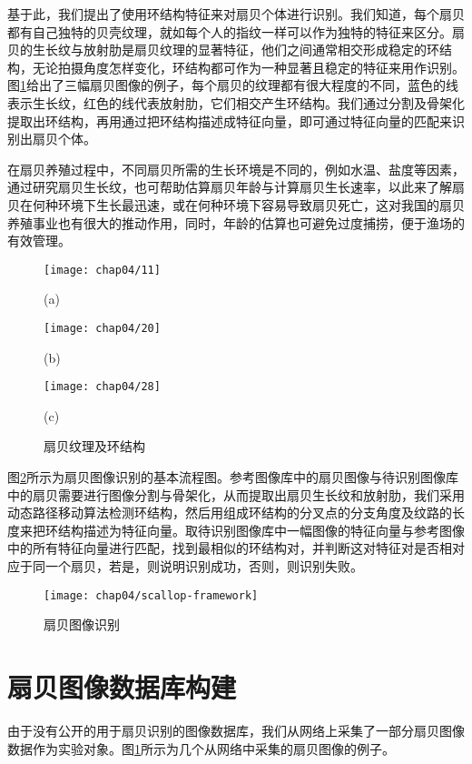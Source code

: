 基于此，我们提出了使用环结构特征来对扇贝个体进行识别。我们知道，每个扇贝都有自己独特的贝壳纹理，就如每个人的指纹一样可以作为独特的特征来区分。扇贝的生长纹与放射肋是扇贝纹理的显著特征，他们之间通常相交形成稳定的环结构，无论拍摄角度怎样变化，环结构都可作为一种显著且稳定的特征来用作识别。图\ref{fig:scallop}给出了三幅扇贝图像的例子，每个扇贝的纹理都有很大程度的不同，蓝色的线表示生长纹，红色的线代表放射肋，它们相交产生环结构。我们通过分割及骨架化提取出环结构，再用通过把环结构描述成特征向量，即可通过特征向量的匹配来识别出扇贝个体。

在扇贝养殖过程中，不同扇贝所需的生长环境是不同的，例如水温、盐度等因素，通过研究扇贝生长纹，也可帮助估算扇贝年龄\cite{hurley}与计算扇贝生长速率\cite{david}，以此来了解扇贝在何种环境下生长最迅速，或在何种环境下容易导致扇贝死亡，这对我国的扇贝养殖事业也有很大的推动作用，同时，年龄的估算也可避免过度捕捞，便于渔场的有效管理。

\begin{figure}
\centering
  \begin{minipage}[b]{0.3\textwidth} 
      \centering 
      \texttt{[image: chap04/11]}
        \centerline{(a)}\medskip
    \end{minipage}
  \begin{minipage}[b]{0.3\textwidth}
    \centering
    \texttt{[image: chap04/20]}
      \centerline{(b)}\medskip
  \end{minipage}
  \begin{minipage}[b]{0.3\textwidth}
    \centering
    \texttt{[image: chap04/28]}
      \centerline{(c)}\medskip
  \end{minipage}
\caption{扇贝纹理及环结构}
\label{fig:scallop}
\end{figure}



图\ref{fig:scallop-framework}所示为扇贝图像识别的基本流程图。参考图像库中的扇贝图像与待识别图像库中的扇贝需要进行图像分割与骨架化，从而提取出扇贝生长纹和放射肋，我们采用动态路径移动算法检测环结构，然后用组成环结构的分叉点的分支角度及纹路的长度来把环结构描述为特征向量。取待识别图像库中一幅图像的特征向量与参考图像中的所有特征向量进行匹配，找到最相似的环结构对，并判断这对特征对是否相对应于同一个扇贝，若是，则说明识别成功，否则，则识别失败。


\begin{figure}
  \centering
  \texttt{[image: chap04/scallop-framework]}
  \caption{扇贝图像识别}
  \label{fig:scallop-framework}
\end{figure}
\section{扇贝图像数据库构建}
\label{}
由于没有公开的用于扇贝识别的图像数据库，我们从网络上采集了一部分扇贝图像数据作为实验对象。图\ref{fig:scallop}所示为几个从网络中采集的扇贝图像的例子。


